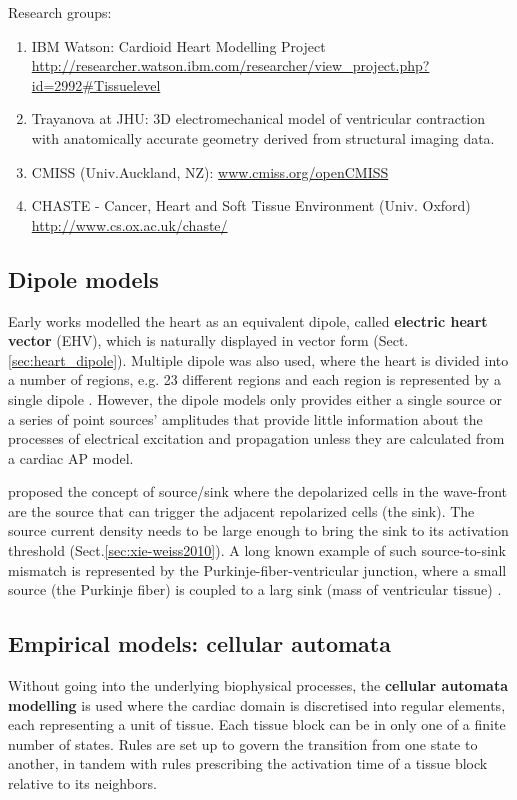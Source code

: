 Research groups:
\begin{enumerate}
  \item IBM Watson: Cardioid Heart Modelling Project
  \url{http://researcher.watson.ibm.com/researcher/view_project.php?id=2992#Tissuelevel}
  \item Trayanova at JHU: 3D electromechanical model of ventricular contraction
  with anatomically accurate geometry derived from structural imaging data.
  \item CMISS (Univ.Auckland, NZ): \url{www.cmiss.org/openCMISS}
  \item CHASTE - Cancer, Heart and Soft Tissue Environment (Univ. Oxford)
  \url{http://www.cs.ox.ac.uk/chaste/}
\end{enumerate}

\subsection{Dipole models}

Early works modelled the heart as an equivalent dipole, called {\bf electric
heart vector} (EHV), which is naturally displayed in vector form
(Sect.\ref{sec:heart_dipole}).  Multiple dipole was also used, where the heart
is divided into a number of regions, e.g. 23 different regions and each region
is represented by a single dipole \citep{Miller1978}. However, the dipole models
only provides either a single source or a series of point sources' amplitudes
that provide little information about the processes of electrical excitation and
propagation unless they are calculated from a cardiac AP model.

\citep{xie2010sls} proposed the concept of source/sink where the depolarized
cells in the wave-front are the source that can trigger the adjacent repolarized
cells (the sink). The source current density needs to be large enough to bring
the sink to its activation threshold (Sect.\ref{sec:xie-weiss2010}). A long
known example of such source-to-sink mismatch is represented by the
Purkinje-fiber-ventricular junction, where a small source (the Purkinje fiber)
is coupled to a larg sink (mass of ventricular tissue) \citep{mendez1970,
overholt1984, joyner1982, rohr2004prop}.

\subsection{Empirical models: cellular automata}

Without going into the underlying biophysical processes, the {\bf cellular
automata modelling} is used where the cardiac domain is discretised into regular
elements, each representing a unit of tissue. Each tissue block can be in only
one of a finite number of states. Rules are set up to govern the transition from
one state to another, in tandem with rules prescribing the activation time of a
tissue block relative to its neighbors.

